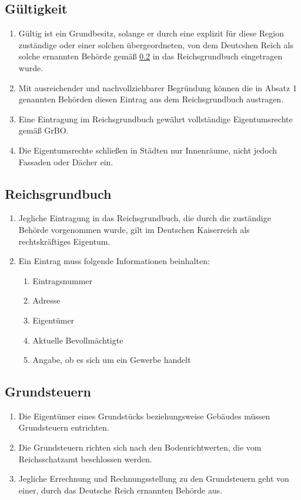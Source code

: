 \documentclass{article}
\begin{document}
\subsection{Gültigkeit}
\begin{enumerate}[(1)]
    \item Gültig ist ein Grundbesitz, solange er durch eine explizit für diese Region zuständige oder einer solchen übergeordneten, von dem
    Deutcshen Reich als solche ernannten Behörde gemäß \ref{rgbuch} in das Reichsgrundbuch eingetragen wurde.
    \item Mit ausreichender und nachvollziehbarer Begründung können die in Absatz 1 genannten Behörden diesen Eintrag aus dem Reichsgrundbuch austragen.
    \item Eine Eintragung im Reichsgrundbuch gewährt vollständige Eigentumsrechte gemäß GrBO.
    \item Die Eigentumsrechte schließen in Städten nur Innenräume, nicht jedoch Fassaden oder Dächer ein.
\end{enumerate}
\subsection{Reichsgrundbuch}\label{rgbuch}
\begin{enumerate}[(1)]
    \item Jegliche Eintragung in das Reichsgrundbuch, die durch die zuständige Behörde vorgenommen wurde, gilt im Deutschen Kaiserreich als rechtskräftiges Eigentum.
    \item Ein Eintrag muss folgende Informationen beinhalten:
    \begin{enumerate}[1.]
        \item Eintragsnummer
        \item Adresse
        \item Eigentümer
        \item Aktuelle Bevollmächtigte
        \item Angabe, ob es sich um ein Gewerbe handelt
    \end{enumerate}
\end{enumerate}
\subsection{Grundsteuern}
\begin{enumerate}[(1)]
    \item Die Eigentümer eines Grundstücks beziehungsweise Gebäudes müssen Grundsteuern entrichten.
    \item Die Grundsteuern richten sich nach den Bodenrichtwerten, die vom Reichsschatzamt beschlossen werden.
    \item Jegliche Errechnung und Rechnungsstellung zu den Grundsteuern geht von einer, durch das Deutsche Reich ernannten Behörde aus.
\end{enumerate}
\end{document}
